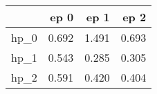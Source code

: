 \begin{tabular}{lrrr}
\toprule
{} &   ep 0 &   ep 1 &   ep 2 \\
\midrule
hp\_0 &  0.692 &  1.491 &  0.693 \\
hp\_1 &  0.543 &  0.285 &  0.305 \\
hp\_2 &  0.591 &  0.420 &  0.404 \\
\bottomrule
\end{tabular}
